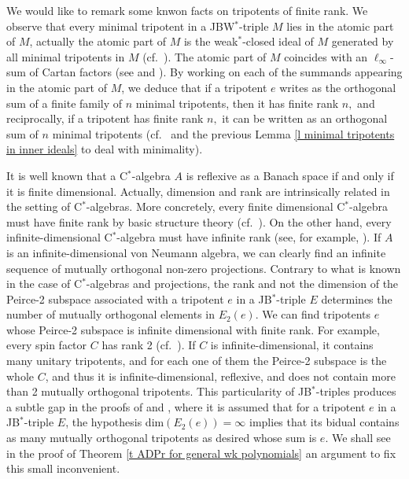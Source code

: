 \documentclass[10pt]{amsart}
\begin{document}
	We would like to remark some knwon facts on tripotents of finite rank. We observe that every minimal tripotent in a JBW$^*$-triple $M$ lies in the atomic part of $M$, actually the atomic part of $M$ is the weak$^*$-closed ideal of $M$ generated by all minimal tripotents in $M$ (cf.\ \cite{FriRu85}). The atomic part of $M$ coincides with an $\ell_{\infty}$-sum of Cartan factors (see \cite[Proposition 2]{FriRu85} and \cite[Corollary 1.8]{Horn87b}). By working on each of the summands appearing in the atomic part of $M$, we deduce that if a tripotent $e$ writes as the orthogonal sum of a finite family of $n$ minimal tripotents, then it has finite rank $n,$ and reciprocally, if a tripotent has finite rank $n,$ it can be written as an orthogonal sum of $n$ minimal tripotents (cf.\ \cite[Comments after Lemma 3.3 in page 200]{Ka97} and the previous Lemma \ref{l minimal tripotents in inner ideals} to deal with minimality).\label{finite rank of tripotents}
	
	It is well known that a C$^*$-algebra $A$ is reflexive as a Banach space if and only if it is finite dimensional. Actually, dimension and rank are intrinsically related in the setting of C$^*$-algebras. More concretely, every finite dimensional C$^*$-algebra must have finite rank by basic structure theory (cf.\ \cite[Theorem I.11.2]{TakBook78}). On the other hand, every infinite-dimensional C$^*$-algebra must have infinite rank (see, for example, \cite[Exercise 4.6.13]{KadRingVolI}). If $A$ is an infinite-dimensional von Neumann algebra, we can clearly find an infinite sequence of mutually orthogonal non-zero projections.
	Contrary to what is known in the case of C$^*$-algebras and projections, the rank and not the dimension of the Peirce-2 subspace associated with a tripotent $e$ in a JB$^*$-triple $E$ determines the number of mutually orthogonal elements in $E_2(e)$. We can find tripotents $e$ whose Peirce-2 subspace is infinite dimensional with finite rank. For example, every spin factor $C$ has rank 2 (cf.\ \cite{Ka97}). If $C$ is infinite-dimensional, it contains many unitary tripotents, and for each one of them the Peirce-2 subspace is the whole $C$, and thus it is infinite-dimensional, reflexive, and does not contain more than 2 mutually orthogonal tripotents. This particularity of JB$^*$-triples produces a subtle gap in the proofs of \cite[Theorems 3.5 and 3.6]{Santos2014} and \cite[Theorem 4.5]{MarOikh2004}, where it is assumed that for a tripotent $e$ in a JB$^*$-triple $E$, the hypothesis dim$(E_2(e))= \infty$ implies that its bidual contains as many mutually orthogonal tripotents as desired whose sum is $e$. We shall see in the proof of Theorem \ref{t ADPr for general wk polynomials} an argument to fix this small inconvenient.
	
\end{document}
